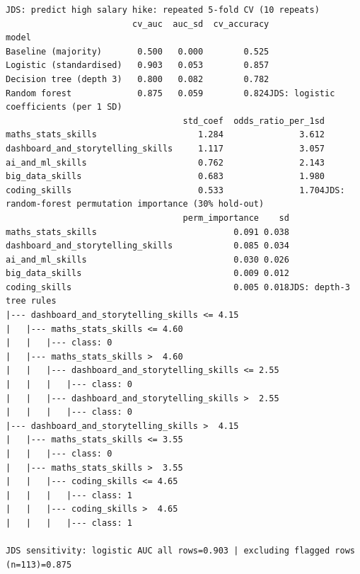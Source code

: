 \documentclass[conference]{IEEEtran}
\begin{document}
\begin{lstlisting}[style=outputstyle,caption={Execution Output G.11a: Junior Model CV and Decision Rules (Table VII).},label={out:jds_models}]
JDS: predict high salary hike: repeated 5-fold CV (10 repeats)
                         cv_auc  auc_sd  cv_accuracy
model                                               
Baseline (majority)       0.500   0.000        0.525
Logistic (standardised)   0.903   0.053        0.857
Decision tree (depth 3)   0.800   0.082        0.782
Random forest             0.875   0.059        0.824JDS: logistic coefficients (per 1 SD)
                                   std_coef  odds_ratio_per_1sd
maths_stats_skills                    1.284               3.612
dashboard_and_storytelling_skills     1.117               3.057
ai_and_ml_skills                      0.762               2.143
big_data_skills                       0.683               1.980
coding_skills                         0.533               1.704JDS: random-forest permutation importance (30% hold-out)
                                   perm_importance    sd
maths_stats_skills                           0.091 0.038
dashboard_and_storytelling_skills            0.085 0.034
ai_and_ml_skills                             0.030 0.026
big_data_skills                              0.009 0.012
coding_skills                                0.005 0.018JDS: depth-3 tree rules
|--- dashboard_and_storytelling_skills <= 4.15
|   |--- maths_stats_skills <= 4.60
|   |   |--- class: 0
|   |--- maths_stats_skills >  4.60
|   |   |--- dashboard_and_storytelling_skills <= 2.55
|   |   |   |--- class: 0
|   |   |--- dashboard_and_storytelling_skills >  2.55
|   |   |   |--- class: 0
|--- dashboard_and_storytelling_skills >  4.15
|   |--- maths_stats_skills <= 3.55
|   |   |--- class: 0
|   |--- maths_stats_skills >  3.55
|   |   |--- coding_skills <= 4.65
|   |   |   |--- class: 1
|   |   |--- coding_skills >  4.65
|   |   |   |--- class: 1

JDS sensitivity: logistic AUC all rows=0.903 | excluding flagged rows (n=113)=0.875
\end{lstlisting}
\end{document}
